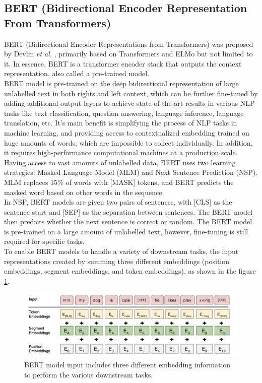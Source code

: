 \documentclass[%
	BCOR=8mm, %
	DIV=12,
	toc=bibliography, %
	toc=listof, %
	oneside, %
	egregdoesnotlikesansseriftitles, %
	]{scrbook}
\begin{document}
\subsection{BERT (Bidirectional Encoder Representation From Transformers)}
BERT (Bidirectional Encoder Representations from Transformers) was proposed by Devlin \textit{et al.} \cite{devlin_bert_2019-1}, primarily based on Transformers \cite{vaswani_attention_2017} and ELMo \cite{peters_deep_2018-3} but not limited to it. In essence, BERT is a transformer encoder stack that outputs the context representation, also called a pre-trained model. \\
BERT model is pre-trained on the deep bidirectional representation of large unlabelled text in both rights and left context, which can be further fine-tuned by adding additional output layers to achieve state-of-the-art results in various NLP tasks like text classification, question answering, language inference, language translation, etc. It's main benefit is simplifying the process of NLP tasks in machine learning, and providing access to contextualized embedding trained on huge amounts of words, which are impossible to collect individually. In addition, it requires high-performance computational machines at a production scale. \\
Having access to vast amounts of unlabelled data,  BERT uses two learning strategies: Masked Language Model (MLM) and Next Sentence Prediction (NSP). MLM replaces 15\% of words with [MASK] tokens, and BERT predicts the masked word based on other words in the sequence.\\
In NSP, BERT models are given two pairs of sentences, with [CLS] as the sentence start and [SEP] as the separation between sentences. The BERT model then predicts whether the next sentence is correct or random. The BERT model is pre-trained on a large amount of unlabelled text, however, fine-tuning is still required for specific tasks.\\
To enable BERT models to handle a variety of downstream tasks, the input representations created by summing three different embeddings (position embeddings, segment embeddings, and token embeddings), as shown in the figure \ref{fig:bert_inp}.
\begin{figure}[H]
    \centering
    \includegraphics[width=0.65\linewidth]{img/bert_inp.png}
    \caption[Three different embeddings in BERT model]{\small BERT model input includes three different embedding information to perform the various downstream tasks\cite{devlin_bert_2019-1}. }
    \label{fig:bert_inp}
\end{figure}
\end{document}
